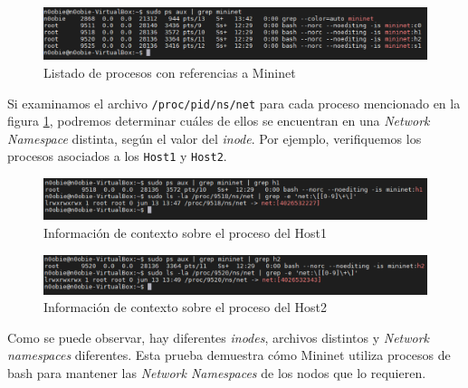 \begin{figure}[ht]
    \centering
    \includegraphics[width=\textwidth]{archivos/img/teoria/mn_03.png}
    \caption{Listado de procesos con referencias a Mininet}
    \label{fig:mininet_03}
\end{figure}

Si examinamos el archivo \texttt{/proc/{pid}/ns/net} para cada proceso mencionado en la figura \ref{fig:mininet_03}, podremos determinar cuáles de ellos se encuentran en una \textit{Network Namespace} distinta, según el valor del \textit{inode}. Por ejemplo, verifiquemos los procesos asociados a los \texttt{Host1} y \texttt{Host2}.\\


\begin{figure}[ht]
    \centering
    \includegraphics[width=\textwidth]{archivos/img/teoria/mn_04.png}
    \caption{Información de contexto sobre el proceso del Host1}
    \label{fig:mininet_04}
\end{figure}

\newpage

\begin{figure}[ht]
    \centering
    \includegraphics[width=\textwidth]{archivos/img/teoria/mn_05.png}
    \caption{Información de contexto sobre el proceso del Host2}
    \label{fig:mininet_05}
\end{figure}

Como se puede observar, hay diferentes \textit{inodes}, archivos distintos y \textit{Network namespaces} diferentes. Esta prueba demuestra cómo Mininet utiliza procesos de bash para mantener las \textit{Network Namespaces} de los nodos que lo requieren.


